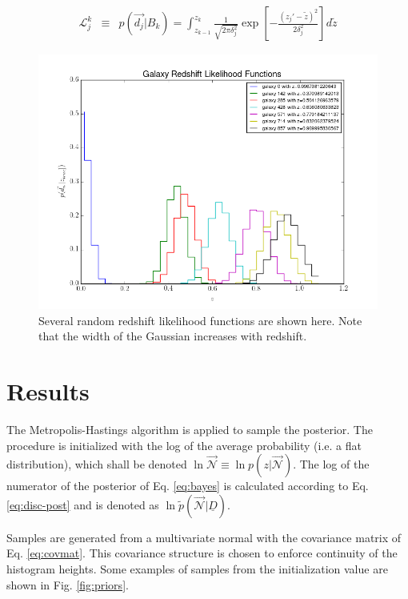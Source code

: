 \documentclass[12pt, onecolumn]{emulateapj}
\newcommand{\textul}{\underline}
\begin{document}
\begin{eqnarray}
\label{eq:zdist}
\mathcal{L}_{j}^{k} &\equiv& p(\vec{d_{j}}|B_{k}) = \int_{z_{k-1}}^{z_{k}} \frac{1}{\sqrt{2\pi\delta_{j}^{2}}}\exp\left[-\frac{(z_{j}'-\tilde{z})^{2}}{2\delta_{j}^{2}}\right]d\tilde{z}
\end{eqnarray}

\begin{figure}
\label{fig:pzs}
\includegraphics[scale=0.5]{lik-samps.png}
\caption{Several random redshift likelihood functions are shown here.  Note that the width of the Gaussian increases with redshift.}
\end{figure}

\section{Results}

The Metropolis-Hastings algorithm is applied to sample the posterior.  The procedure is initialized with the log of the average probability (i.e. a flat distribution), which shall be denoted $\ln\vec{\mathcal{N}}\equiv\ln p(z|\vec{\mathcal{N}})$.  The log of the numerator of the posterior of Eq. \ref{eq:bayes} is calculated according to Eq. \ref{eq:disc-post} and is denoted as $\ln\tilde{p}(\vec{\mathcal{N}}|\textul{D})$.  

Samples are generated from a multivariate normal with the covariance matrix of Eq. \ref{eq:covmat}.  This covariance structure is chosen to enforce continuity of the histogram heights.  Some examples of samples from the initialization value are shown in Fig. \ref{fig:priors}.
\end{document}
